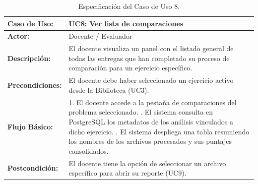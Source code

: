 \begin{table}[H]
	\centering
	\begin{tabular}{|p{3cm}|p{11cm}|}
		\hline
		\rowcolor[HTML]{E7F3FF}
		\textbf{Caso de Uso:}    & \textbf{UC8: Ver lista de comparaciones}                                                                                                              \\ \hline
		\textbf{Actor:}          & Docente / Evaluador                                                                                                                                   \\ \hline
		\textbf{Descripción:}    & El docente visualiza un panel con el listado general de todas las entregas que han completado su proceso de comparación para un ejercicio específico. \\ \hline
		\textbf{Precondiciones:} & El docente debe haber seleccionado un ejercicio activo desde la Biblioteca (UC3).                                                                     \\ \hline
		\textbf{Flujo Básico:}   &
		1. El docente accede a la pestaña de comparaciones del problema seleccionado. \newline
		2. El sistema consulta en PostgreSQL los metadatos de los análisis vinculados a dicho ejercicio. \newline
		3. El sistema despliega una tabla resumiendo los nombres de los archivos procesados y sus puntajes consolidados.                                                                 \\ \hline
		\textbf{Postcondición:}  & El docente tiene la opción de seleccionar un archivo específico para abrir su reporte (UC9).                                                          \\ \hline
	\end{tabular}
	\caption{Especificación del Caso de Uso 8.}
\end{table}

